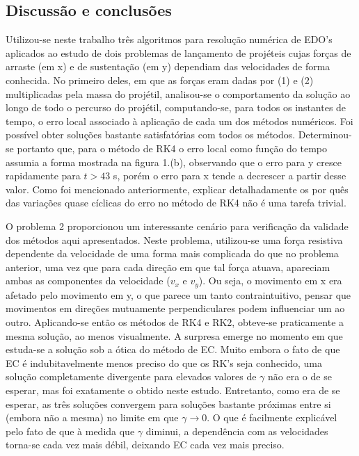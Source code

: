 \documentclass[a4paper, brazilian, 8pt, final]{article}
\begin{document}
\begin{multicols}{2}
\section{Discussão e conclusões}
\quad Utilizou-se neste trabalho três algoritmos para resolução numérica de EDO's aplicados ao estudo de dois problemas de lançamento de projéteis cujas forças de arraste (em x) e de sustentação (em y) dependiam das velocidades de forma conhecida. No primeiro deles, em que as forças eram dadas por (1) e (2) multiplicadas pela massa do projétil, analisou-se o comportamento da solução ao longo de todo o percurso do projétil, computando-se, para todos os instantes de tempo, o erro local associado à aplicação de cada um dos métodos numéricos. Foi possível obter soluções bastante satisfatórias com todos os métodos. Determinou-se portanto que, para o método de RK4 o erro local como função do tempo assumia a forma mostrada na figura 1.(b), observando que o erro para y cresce rapidamente para $t > 43$ s, porém o erro para x tende a decrescer a partir desse valor. Como foi mencionado anteriormente, explicar detalhadamente os por quês das variações quase cíclicas do erro no método de RK4 não é uma tarefa trivial. 

\quad O problema 2 proporcionou um interessante cenário para verificação da validade dos métodos aqui apresentados. Neste problema, utilizou-se uma força resistiva dependente da velocidade de uma forma mais complicada do que no problema anterior, uma vez que para cada direção em que tal força atuava, apareciam ambas as componentes da velocidade ($v_{x}$ e $v_{y}$). Ou seja, o movimento em x era afetado pelo movimento em y, o que parece um tanto contraintuitivo, pensar que movimentos em direções mutuamente perpendiculares podem influenciar um ao outro. Aplicando-se então os métodos de RK4 e RK2, obteve-se praticamente a mesma solução, ao menos visualmente. A surpresa emerge no momento em que estuda-se a solução sob a ótica do método de EC. Muito embora o fato de que EC é indubitavelmente menos preciso do que os RK's seja conhecido, uma solução completamente divergente para elevados valores de $\gamma$ não era o de se esperar, mas foi exatamente o obtido neste estudo. Entretanto, como era de se esperar, as três soluções convergem para soluções bastante próximas entre si (embora não a mesma) no limite em que $\gamma \rightarrow 0$. O que é facilmente explicável pelo fato de que à medida que $\gamma$ diminui, a dependência com as velocidades torna-se cada vez mais débil, deixando EC cada vez mais preciso.


\end{multicols}
\end{document}
